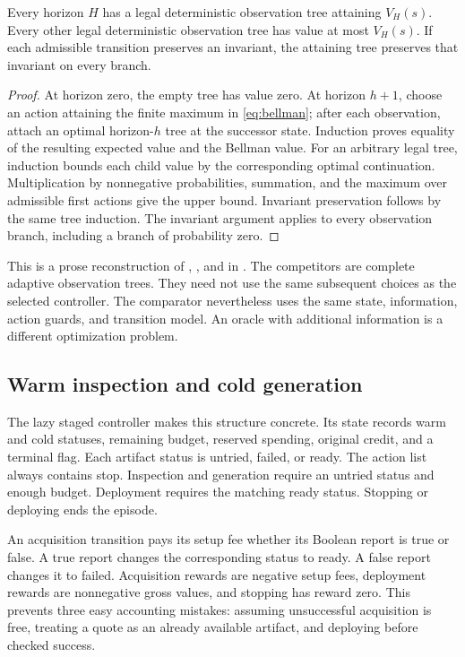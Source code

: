 \begin{theorem}
Every horizon $H$ has a legal deterministic observation tree attaining
$V_H(s)$. Every other legal deterministic observation tree has value at most
$V_H(s)$. If each admissible transition preserves an invariant, the attaining
tree preserves that invariant on every branch.
\end{theorem}
\begin{proof}
At horizon zero, the empty tree has value zero. At horizon $h+1$, choose an
action attaining the finite maximum in \eqref{eq:bellman}; after each observation,
attach an optimal horizon-$h$ tree at the successor state. Induction proves
equality of the resulting expected value and the Bellman value. For an arbitrary
legal tree, induction bounds each child value by the corresponding optimal
continuation. Multiplication by nonnegative probabilities, summation, and the
maximum over admissible first actions give the upper bound. Invariant
preservation follows by the same tree induction. The invariant argument applies
to every observation branch, including a branch of probability zero.
\end{proof}

This is a prose reconstruction of
,
, and  in
. The competitors are complete adaptive
observation trees. They need not use the same subsequent choices as the selected
controller. The comparator nevertheless uses the same state, information,
action guards, and transition model. An oracle with additional information is a
different optimization problem.

\subsection{Warm inspection and cold generation}

The lazy staged controller makes this structure concrete. Its state records
warm and cold statuses, remaining budget, reserved spending, original credit,
and a terminal flag. Each artifact status is untried, failed, or ready. The
action list always contains stop. Inspection and generation require an untried
status and enough budget. Deployment requires the matching ready status.
Stopping or deploying ends the episode.

An acquisition transition pays its setup fee whether its Boolean report is true
or false. A true report changes the corresponding status to ready. A false
report changes it to failed. Acquisition rewards are negative setup fees,
deployment rewards are nonnegative gross values, and stopping has reward zero.
This prevents three easy accounting mistakes: assuming unsuccessful acquisition
is free, treating a quote as an already available artifact, and deploying before
checked success.

